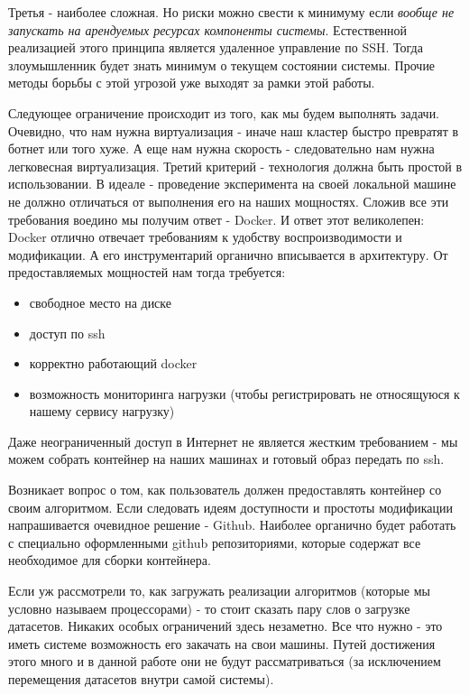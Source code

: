 Третья - наиболее сложная. Но риски можно свести к минимуму если \textit{вообще не запускать на арендуемых ресурсах компоненты системы}. Естественной реализацией этого принципа является удаленное управление по SSH. Тогда злоумышленник будет знать минимум о текущем состоянии системы. Прочие методы борьбы с этой угрозой уже выходят за рамки этой работы.

Следующее ограничение происходит из того, как мы будем выполнять задачи. Очевидно, что нам нужна виртуализация - иначе наш кластер быстро превратят в ботнет или того хуже. А еще нам нужна скорость - следовательно нам нужна легковесная виртуализация. Третий критерий - технология должна быть простой в использовании. В идеале - проведение эксперимента на своей локальной машине не должно отличаться от выполнения его на наших мощностях. Сложив все эти требования воедино мы получим ответ - Docker. И ответ этот великолепен: Docker отлично отвечает требованиям к удобству воспроизводимости и модификации. А его инструментарий органично вписывается в архитектуру. От предоставляемых мощностей нам тогда требуется:

\begin{itemize}
	\item свободное место на диске
	\item доступ по ssh
	\item корректно работающий docker
	\item возможность мониторинга нагрузки (чтобы регистрировать не относящуюся к нашему сервису нагрузку)
\end{itemize}

Даже неограниченный доступ в Интернет не является жестким требованием - мы можем собрать контейнер на наших машинах и готовый образ передать по ssh.

Возникает вопрос о том, как пользователь должен предоставлять контейнер со своим алгоритмом. Если следовать идеям доступности и простоты модификации напрашивается очевидное решение - Github. Наиболее органично будет работать с специально оформленными github репозиториями, которые содержат все необходимое для сборки контейнера.

Если уж рассмотрели то, как загружать реализации алгоритмов (которые мы условно называем процессорами) - то стоит сказать пару слов о загрузке датасетов. Никаких особых ограничений здесь незаметно. Все что нужно - это иметь системе возможность его закачать на свои машины. Путей достижения этого много и в данной работе они не будут рассматриваться (за исключением перемещения датасетов внутри самой системы).

